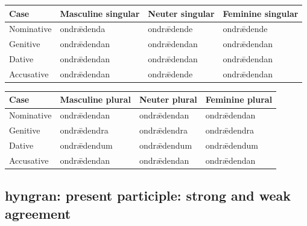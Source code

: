 \par\begingroup
\fontsize{10.5}{13.2}\selectfont
\setlength{\LTleft}{0pt}\setlength{\LTright}{\fill}
\noindent
\begin{tabular}{@{}>{\raggedright\arraybackslash}p{22.0mm}>{\raggedright\arraybackslash}p{31.188mm}>{\raggedright\arraybackslash}p{31.188mm}>{\raggedright\arraybackslash}p{31.188mm}@{}}
\toprule
\textbf{Case} & \textbf{Masculine singular} & \textbf{Neuter singular} & \textbf{Feminine singular} \\
\midrule
Nominative & ondrǣdenda & ondrǣdende & ondrǣdende \\
Genitive & ondrǣdendan & ondrǣdendan & ondrǣdendan \\
Dative & ondrǣdendan & ondrǣdendan & ondrǣdendan \\
Accusative & ondrǣdendan & ondrǣdende & ondrǣdendan \\
\bottomrule
\end{tabular}
\par\endgroup
\par\addvspace{5pt}
\par\begingroup
\fontsize{10.5}{13.2}\selectfont
\setlength{\LTleft}{0pt}\setlength{\LTright}{\fill}
\noindent
\begin{tabular}{@{}>{\raggedright\arraybackslash}p{22.0mm}>{\raggedright\arraybackslash}p{31.188mm}>{\raggedright\arraybackslash}p{31.188mm}>{\raggedright\arraybackslash}p{31.188mm}@{}}
\toprule
\textbf{Case} & \textbf{Masculine plural} & \textbf{Neuter plural} & \textbf{Feminine plural} \\
\midrule
Nominative & ondrǣdendan & ondrǣdendan & ondrǣdendan \\
Genitive & ondrǣdendra & ondrǣdendra & ondrǣdendra \\
Dative & ondrǣdendum & ondrǣdendum & ondrǣdendum \\
Accusative & ondrǣdendan & ondrǣdendan & ondrǣdendan \\
\bottomrule
\end{tabular}
\par\endgroup

\subsection*{hyngran: present participle: strong and weak agreement}

